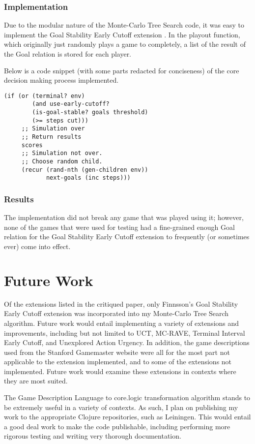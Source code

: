 \documentclass[letterpaper]{article}
\begin{document}
\subsubsection{Implementation}
Due to the modular nature of the Monte-Carlo Tree Search code, it was easy to implement the Goal Stability Early Cutoff extension \cite{finnsson2012generalized}. In the playout function, which originally just randomly plays a game to completely, a list of the result of the Goal relation is stored for each player.

Below is a code snippet (with some parts redacted for conciseness) of the core decision making process implemented.
\begin{lstlisting}[frame=single,caption=Clojure implementation of Goal Stability Early Cutoff]
(if (or (terminal? env)
        (and use-early-cutoff?
        (is-goal-stable? goals threshold)
        (>= steps cut)))
     ;; Simulation over
     ;; Return results
     scores
     ;; Simulation not over.
     ;; Choose random child.
     (recur (rand-nth (gen-children env)) 
            next-goals (inc steps)))
\end{lstlisting}

\subsubsection{Results}
The implementation did not break any game that was played using it; however, none of the games that were used for testing had a fine-grained enough Goal relation for the Goal Stability Early Cutoff extension to frequently (or sometimes ever) come into effect.

\section{Future Work}

Of the extensions listed in the critiqued paper, only Finnsson's Goal Stability Early Cutoff extension was incorporated into my Monte-Carlo Tree Search algorithm. Future work would entail implementing a variety of extensions and improvements, including but not limited to UCT, MC-RAVE, Terminal Interval Early Cutoff, and Unexplored Action Urgency. In addition, the game descriptions used from the Stanford Gamemaster website were all for the most part not applicable to the extension implemented, and to some of the extensions not implemented. Future work would examine these extensions in contexts where they are most suited.

The Game Description Language to core.logic transformation algorithm stands to be extremely useful in a variety of contexts. As such, I plan on publishing my work to the appropriate Clojure repositories, such as Leiningen. This would entail a good deal work to make the code publishable, including performing more rigorous testing and writing very thorough documentation.
\end{document}
